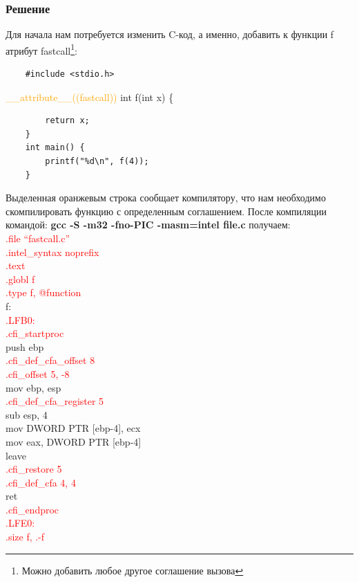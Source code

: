 \documentclass[12pt, letterpaper]{article}
\begin{document}
\subsubsection{Решение}
Для начала нам потребуется изменить C-код, а именно, добавить к функции f атрибут fastcall\footnote{Можно добавить любое другое соглашение вызова}:
\begin{verbatim}
    #include <stdio.h>
\end{verbatim}
    \textcolor{orange}{\indent \_\_attribute\_\_((fastcall))} int f(int x) \{
\begin{verbatim}
        return x;
    }
    int main() {
        printf("%d\n", f(4));
    }
\end{verbatim}
Выделенная оранжевым строка сообщает компилятору, что нам необходимо скомпилировать функцию с определенным соглашением. После компиляции командой: \textbf{gcc -S -m32 -fno-PIC -masm=intel file.c} получаем:\\
\textcolor{red}{
        \indent .file	``fastcall.c''\\
	\indent .intel\_syntax noprefix\\
	\indent .text\\
	\indent .globl	f\\
	\indent .type	f, @function}\\
f:\\
\textcolor{red}{
.LFB0:\\
	\indent .cfi\_startproc}\\
	\indent push	ebp\\
\textcolor{red}{
	\indent .cfi\_def\_cfa\_offset 8\\
	\indent .cfi\_offset 5, -8}\\
	\indent mov	ebp, esp\\
\textcolor{red}{
	\indent .cfi\_def\_cfa\_register 5}\\
	\indent sub	esp, 4\\
	\indent mov	DWORD PTR [ebp-4], ecx\\
	\indent mov	eax, DWORD PTR [ebp-4]\\
	\indent leave\\
\textcolor{red}{
	\indent .cfi\_restore 5\\
	\indent .cfi\_def\_cfa 4, 4}\\
	\indent ret\\
\textcolor{red}{
	\indent .cfi\_endproc}\\
\textcolor{red}{
.LFE0:\\
	\indent .size	f, .-f}\\
\end{document}
